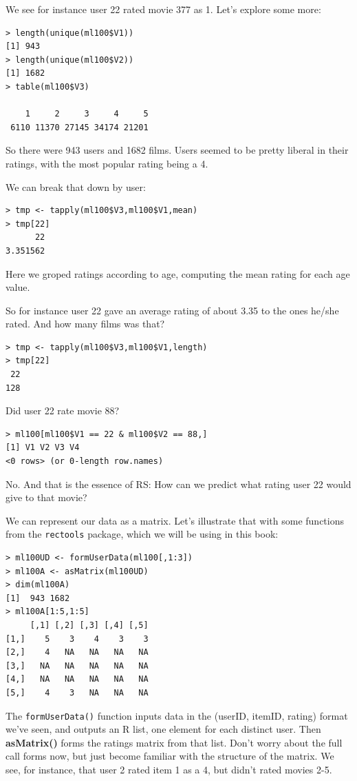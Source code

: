 We see for instance user 22 rated movie 377 as 1.  Let's explore some more:

\begin{lstlisting}
> length(unique(ml100$V1))
[1] 943
> length(unique(ml100$V2))
[1] 1682
> table(ml100$V3)

    1     2     3     4     5 
 6110 11370 27145 34174 21201 
\end{lstlisting}

So there were 943 users and 1682 films.  Users seemed to be pretty
liberal in their ratings, with the most popular rating being a 4.

We can break that down by user:

\begin{lstlisting}
> tmp <- tapply(ml100$V3,ml100$V1,mean)
> tmp[22]
      22 
3.351562 
\end{lstlisting}

Here we groped ratings according to age, computing the mean rating for
each age value.

So for instance user 22 gave an average rating of about 3.35 to the ones
he/she rated.  And how many films was that?

\begin{lstlisting}
> tmp <- tapply(ml100$V3,ml100$V1,length)
> tmp[22]
 22 
128 
\end{lstlisting}

Did user 22 rate movie 88?

\begin{lstlisting}
> ml100[ml100$V1 == 22 & ml100$V2 == 88,]
[1] V1 V2 V3 V4
<0 rows> (or 0-length row.names)
\end{lstlisting}

No.  And that is the essence of RS:  How can we predict what rating user
22 would give to that movie?

We can represent our data as a matrix.  Let's illustrate that with some
functions from the \lstinline{rectools} package, which we will be using
in this book:

\begin{lstlisting}
> ml100UD <- formUserData(ml100[,1:3]) 
> ml100A <- asMatrix(ml100UD) 
> dim(ml100A)
[1]  943 1682
> ml100A[1:5,1:5] 
     [,1] [,2] [,3] [,4] [,5]
[1,]    5    3    4    3    3
[2,]    4   NA   NA   NA   NA
[3,]   NA   NA   NA   NA   NA
[4,]   NA   NA   NA   NA   NA
[5,]    4    3   NA   NA   NA
\end{lstlisting}

The \lstinline{formUserData()} function inputs data in the (userID,
itemID, rating) format we've seen, and outputs an R list, one element
for each distinct user.  Then \textbf{asMatrix()} forms the ratings
matrix from that list.  Don't worry about the full call forms now, but
just become familiar with the structure of the matrix.  We see, for
instance, that user 2 rated item 1 as a 4, but didn't rated movies 2-5.

